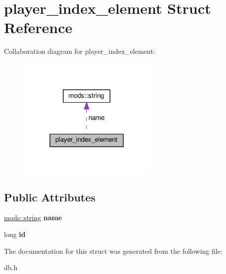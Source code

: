 \hypertarget{structplayer__index__element}{}\section{player\+\_\+index\+\_\+element Struct Reference}
\label{structplayer__index__element}


Collaboration diagram for player\+\_\+index\+\_\+element\+:
\nopagebreak
\begin{figure}[H]
\begin{center}
\leavevmode
\includegraphics[width=191pt]{structplayer__index__element__coll__graph}
\end{center}
\end{figure}
\subsection*{Public Attributes}
\begin{DoxyCompactItemize}
\item 
\mbox{\label{structplayer__index__element_a3deb02912a0e16a6ebc69c305c6d674e}} 
\hyperlink{structmods_1_1string}{mods\+::string} {\bfseries name}
\item 
\mbox{\label{structplayer__index__element_ad502cad2a620a45b4565a41e15e2bea6}} 
long {\bfseries id}
\end{DoxyCompactItemize}


The documentation for this struct was generated from the following file\+:\begin{DoxyCompactItemize}
\item 
db.\+h\end{DoxyCompactItemize}
